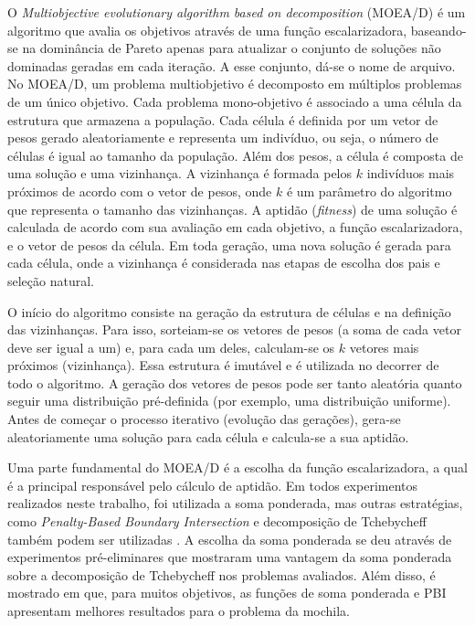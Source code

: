 O \textit{Multiobjective evolutionary algorithm based on decomposition} (MOEA/D) \cite{Zhang2007} é um algoritmo que avalia os objetivos através de uma função escalarizadora, baseando-se na dominância de Pareto apenas para atualizar o conjunto de soluções não dominadas geradas em cada iteração. A esse conjunto, dá-se o nome de arquivo. No MOEA/D, um problema multiobjetivo é decomposto em múltiplos problemas de um único objetivo. Cada problema mono-objetivo é associado a uma célula da estrutura que armazena a população. Cada célula é definida por um vetor de pesos gerado aleatoriamente e representa um indivíduo, ou seja, o número de células é igual ao tamanho da população. Além dos pesos, a célula é composta de uma solução e uma vizinhança. A vizinhança é formada pelos $k$ indivíduos mais próximos de acordo com o vetor de pesos, onde $k$ é um parâmetro do algoritmo que representa o tamanho das vizinhanças. A aptidão (\textit{fitness}) de uma solução é calculada de acordo com sua avaliação em cada objetivo, a função escalarizadora, e o vetor de pesos da célula. Em toda geração, uma nova solução é gerada para cada célula, onde a vizinhança é considerada nas etapas de escolha dos pais e seleção natural.

O início do algoritmo consiste na geração da estrutura de células e na definição das vizinhanças. Para isso, sorteiam-se os vetores de pesos (a soma de cada vetor deve ser igual a um) e, para cada um deles, calculam-se os $k$ vetores mais próximos (vizinhança). Essa estrutura é imutável e é utilizada no decorrer de todo o algoritmo. A geração dos vetores de pesos pode ser tanto aleatória quanto seguir uma distribuição pré-definida (por exemplo, uma distribuição uniforme). Antes de começar o processo iterativo (evolução das gerações), gera-se aleatoriamente uma solução para cada célula e calcula-se a sua aptidão. 

Uma parte fundamental do MOEA/D é a escolha da função escalarizadora, a qual é a principal responsável pelo cálculo de aptidão. Em todos experimentos realizados neste trabalho, foi utilizada a soma ponderada, mas outras estratégias, como \textit{Penalty-Based Boundary Intersection} e decomposição de Tchebycheff também podem ser utilizadas \cite{Zhang2007}. A escolha da soma ponderada se deu através de experimentos pré-eliminares que mostraram uma vantagem da soma ponderada sobre a decomposição de Tchebycheff nos problemas avaliados. Além disso, é mostrado em  que, para muitos objetivos, as funções de soma ponderada e PBI apresentam melhores resultados para o problema da mochila.

